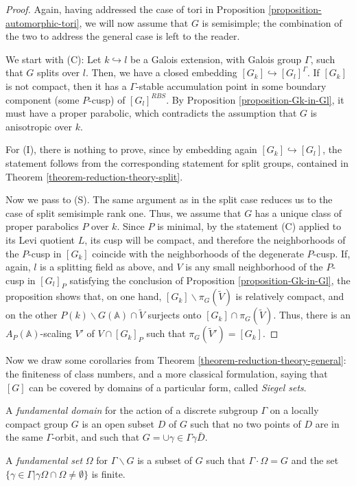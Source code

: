 \begin{proof}
Again, having addressed the case of tori in Proposition \ref{proposition-automorphic-tori}, we will now assume that $G$ is semisimple; the combination of the two to address the general case is left to the reader. 


We start with (C):  Let $k\hookrightarrow l$ be a Galois extension, with Galois group $\Gamma$, such that $G$ splits over $l$. Then, we have a closed embedding $[G_k]\hookrightarrow [G_l]^\Gamma$. If $[G_k]$ is not compact, then it has a $\Gamma$-stable accumulation point in some boundary component (some $P$-cusp) of $[G_l]^{RBS}$. By Proposition \ref{proposition-Gk-in-Gl}, it must have a proper parabolic, which contradicts the assumption that $G$ is anisotropic over $k$.

For (I), there is nothing to prove, since by embedding again $[G_k]\hookrightarrow [G_l]$, the statement follows from the corresponding statement for split groups, contained in Theorem \ref{theorem-reduction-theory-split}.

 
Now we pass to (S). The same argument as in the split case reduces us to the case of split semisimple rank one. Thus, we assume that $G$ has a unique class of proper parabolics $P$ over $k$.  Since $P$ is minimal, by the statement (C) applied to its Levi quotient $L$, its cusp will be compact, and therefore the neighborhoods of the $P$-cusp in $[G_k]$ coincide with the neighborhoods of the degenerate $P$-cusp. If, again, $l$ is a splitting field as above, and $V$ is any small neighborhood of the $P$-cusp in $[G_l]_P$ satisfying the conclusion of Proposition \ref{proposition-Gk-in-Gl}, the proposition shows that, on one hand, $[G_k]\smallsetminus \pi_G(\tilde V)$ is relatively compact, and on the other $P(k)\backslash G(\mathbb A)\cap \tilde V$ surjects onto $[G_k]\cap  \pi_G(\tilde V)$. Thus, there is an $A_P(\mathbb A)$-scaling $V'$ of $V\cap [G_k]_P$ such that $\pi_G(\tilde V') = [G_k]$. 
\end{proof}

Now we draw some corollaries from Theorem \ref{theorem-reduction-theory-general}: the finiteness of class numbers, and a more classical formulation, saying that $[G]$ can be covered by domains of a particular form, called \emph{Siegel sets}.

\begin{definition}
 \label{definition-fundamental-set-domain}
A {\it fundamental domain} for the action of a discrete subgroup $\Gamma$ on a locally compact group $G$ is an open subset $D$ of $G$ such that no two points of $D$ are in the same $\Gamma$-orbit, and such that $G= \cup{\gamma\in \Gamma} \gamma \bar D$. 

A {\it fundamental set} $\Omega$ for $\Gamma\backslash G$ is a subset of $G$ such that $\Gamma\cdot \Omega= G$ and the set $\{\gamma\in \Gamma | \gamma \Omega \cap \Omega \neq \emptyset\}$ is finite. 
\end{definition}



